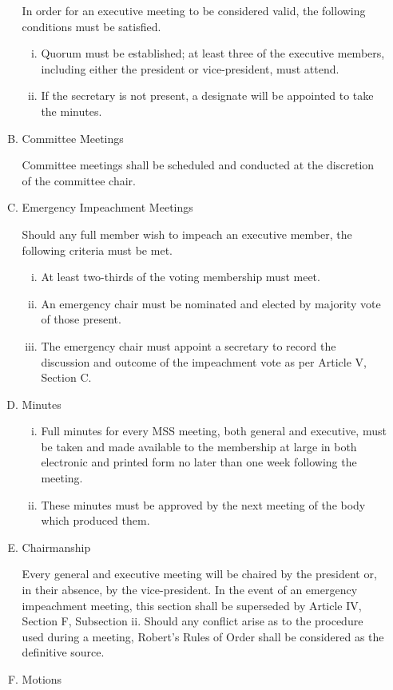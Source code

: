 \documentclass[11pt]{article}
\begin{document}
\begin{enumerate}[I.]
\begin{enumerate}[A)]
      In order for an executive meeting to be considered valid, the following
        conditions must be satisfied.
        \begin{enumerate}[i)]
          \item Quorum must be established; at least three of the executive
            members, including either the president or vice-president, must
            attend. 
          \item  If the secretary is not present, a designate will be appointed
            to take the minutes. 
        \end{enumerate}
      \item Committee Meetings
      
      Committee meetings shall be scheduled and conducted at the discretion of
        the committee chair.
      \item Emergency Impeachment Meetings
      
      Should any full member wish to impeach an executive member, the following
        criteria must be met. 
        \begin{enumerate}[i)]
          \item At least two-thirds of the voting membership must meet. 
          \item An emergency chair must be nominated and elected by majority
            vote of those present. 
          \item The emergency chair must appoint a secretary to record the
            discussion and outcome of the impeachment vote as per Article V,
            Section C. 
        \end{enumerate}
      \item Minutes
        \begin{enumerate}[i)]
          \item Full minutes for every MSS meeting, both general and executive,
            must be taken and made available to the membership at large in both
            electronic and printed form no later than one week following the
            meeting.
          \item These minutes must be approved by the next meeting of the body
            which produced them. 
        \end{enumerate}
      \item Chairmanship
      
      Every general and executive meeting will be chaired by the president or,
      in their absence, by the vice-president. In the event of an emergency
      impeachment meeting, this section shall be superseded by Article IV,
      Section F, Subsection ii. Should any conflict arise as to the procedure
      used during a meeting, Robert's Rules of Order shall be considered as the
      definitive source. 
      \item Motions
      

\end{enumerate}
\end{enumerate}
\end{document}
